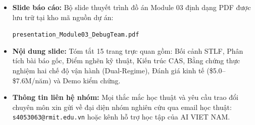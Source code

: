 \begin{itemize}
    \item \textbf{Slide báo cáo:} Bộ slide thuyết trình đồ án Module 03 định dạng PDF được lưu trữ tại kho mã nguồn dự án:
    \begin{center}
        \texttt{presentation\_Module03\_DebugTeam.pdf}
    \end{center}
    \item \textbf{Nội dung slide:} Tóm tắt 15 trang trực quan gồm: Bối cảnh STLF, Phân tích bài báo gốc, Điểm nghẽn kỹ thuật, Kiến trúc CAS, Bằng chứng thực nghiệm hai chế độ vận hành (Dual-Regime), Đánh giá kinh tế (\$5.0--\$7.6M/năm) và Demo kiểm chứng.
    \item \textbf{Thông tin liên hệ nhóm:} Mọi thắc mắc học thuật và yêu cầu trao đổi chuyên môn xin gửi về đại diện nhóm nghiên cứu qua email học thuật: \texttt{s4053063@rmit.edu.vn} hoặc kênh hỗ trợ học tập của AI VIET NAM.
\end{itemize}

